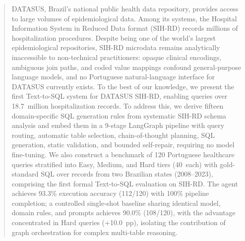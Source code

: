 \documentclass[conference]{IEEEtran}
\begin{document}




\maketitle

\begin{abstract}
DATASUS, Brazil's national public health data repository, provides access to large volumes of epidemiological data. Among its systems, the Hospital Information System in Reduced Data format (SIH-RD) records millions of hospitalization procedures. Despite being one of the world's largest epidemiological repositories, SIH-RD microdata remains analytically inaccessible to non-technical practitioners: opaque clinical encodings, ambiguous join paths, and coded value mappings confound general-purpose language models, and no Portuguese natural-language interface for DATASUS currently exists. To the best of our knowledge, we present the first Text-to-SQL system for DATASUS SIH-RD, enabling queries over 18.7~million hospitalization records.
To address this, we derive fifteen domain-specific SQL generation rules from systematic SIH-RD schema analysis and embed them in a 9-stage LangGraph pipeline with query routing, automatic table selection, chain-of-thought planning, SQL generation, static validation, and bounded self-repair, requiring no model fine-tuning.
We also construct a benchmark of 120 Portuguese healthcare queries stratified into Easy, Medium, and Hard tiers (40~each) with gold-standard SQL over records from two Brazilian states (2008--2023), comprising the first formal Text-to-SQL evaluation on SIH-RD.
The agent achieves 93.3\% execution accuracy (112/120) with 100\% pipeline completion; a controlled single-shot baseline sharing identical model, domain rules, and prompts achieves 90.0\% (108/120), with the advantage concentrated in Hard queries ($+$10.0~pp), isolating the contribution of graph orchestration for complex multi-table reasoning.
\end{abstract}
\end{document}
